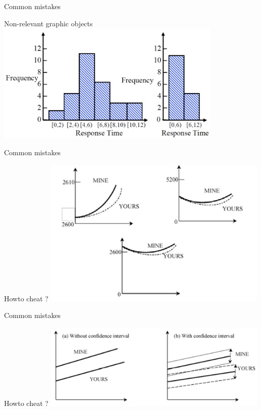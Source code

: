 \documentclass[xcolor=x11names,compress,8pt,fleqn]{beamer}
\renewcommand{\(}{\begin{columns}}
\renewcommand{\)}{\end{columns}}
\newcommand{\<}[1]{\begin{column}{#1}}
\renewcommand{\>}{\end{column}}
\begin{document}
\begin{frame}{Common mistakes}
\begin{block}{Non-relevant graphic objects}
\includegraphics[width=10.8cm]{Jain-graph8}
\end{block}
\end{frame}
\begin{frame}{Common mistakes}
\begin{block}{Howto cheat ?}
\includegraphics[width=10.8cm]{Jain-graph6}
\end{block}
\end{frame}
\begin{frame}{Common mistakes}
\begin{block}{Howto cheat ?}
\includegraphics[width=10.8cm]{Jain-graph7}
\end{block}
\end{frame}
\end{document}
